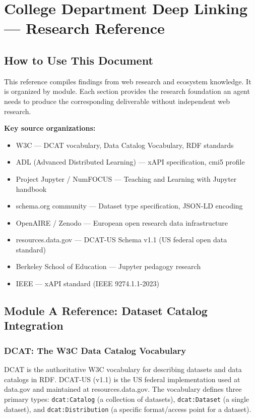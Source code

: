 \documentclass[11pt,letterpaper]{article}
\newcommand{\stageheader}[2]{%
  \noindent\colorbox{#2}{\makebox[\textwidth][l]{%
    \textcolor{white}{\bfseries\sffamily\hspace{6pt}#1\hspace{6pt}}}}%
  \vspace{0.5em}\par%
}
\begin{document}
\newpage
\stageheader{STAGE 2 --- RESEARCH REFERENCE}{secondary}

\section{College Department Deep Linking --- Research Reference}

\subsection{How to Use This Document}

This reference compiles findings from web research and ecosystem knowledge. It is organized by module. Each section provides the research foundation an agent needs to produce the corresponding deliverable without independent web research.

\textbf{Key source organizations:}
\begin{itemize}[noitemsep]
  \item W3C --- DCAT vocabulary, Data Catalog Vocabulary, RDF standards
  \item ADL (Advanced Distributed Learning) --- xAPI specification, cmi5 profile
  \item Project Jupyter / NumFOCUS --- Teaching and Learning with Jupyter handbook
  \item schema.org community --- Dataset type specification, JSON-LD encoding
  \item OpenAIRE / Zenodo --- European open research data infrastructure
  \item resources.data.gov --- DCAT-US Schema v1.1 (US federal open data standard)
  \item Berkeley School of Education --- Jupyter pedagogy research
  \item IEEE --- xAPI standard (IEEE 9274.1.1-2023)
\end{itemize}

\subsection{Module A Reference: Dataset Catalog Integration}

\subsubsection{DCAT: The W3C Data Catalog Vocabulary}

DCAT is the authoritative W3C vocabulary for describing datasets and data catalogs in RDF. DCAT-US (v1.1) is the US federal implementation used at data.gov and maintained at resources.data.gov. The vocabulary defines three primary types: \texttt{dcat:Catalog} (a collection of datasets), \texttt{dcat:Dataset} (a single dataset), and \texttt{dcat:Distribution} (a specific format/access point for a dataset).
\end{document}
